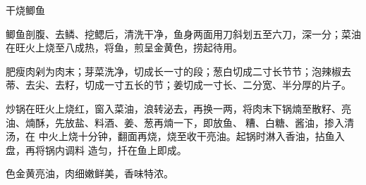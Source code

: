 %
%
%
%
%
%
%
\begin{recipe}{干烧鲫鱼}

\ingredients


\preparation

\step 鲫鱼剖腹、去鳞、挖鳃后，清洗干净，鱼身两面用刀斜划五至六刀，深一分；菜油
在旺火上烧至八成热，将鱼，煎呈金黄色，捞起待用。

\step 肥瘦肉剁为肉末；芽菜洗净，切成长一寸的段；葱白切成二寸长节节；泡辣椒去
蒂、去尖、去籽，切成一寸五长的节；姜切成一寸长、二分宽、半分厚的片子。

\step 炒锅在旺火上烧红，窗入菜油，浪转泌去，再换一两，将肉末下锅煵至散籽、亮
油、煵酥，先放盐、料酒、姜、葱再煵一下，即放鱼、𰪿糟、白糖、酱油，掺入清汤，在
中火上烧十分钟，翻面再烧，烧至收干亮油。起锅时淋入香油，拈鱼入盘，再将锅内调料
造匀，扦在鱼上即成。

\features

色金黄亮油，肉细嫩鲜美，香味特浓。

\end{recipe}

